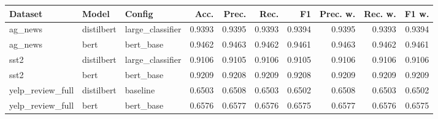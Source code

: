 \begin{tabular}{lllrrrrrrr}
\toprule
Dataset & Model & Config & Acc. & Prec. & Rec. & F1 & Prec. w. & Rec. w. & F1 w. \\
\midrule
ag\_news & distilbert & large\_classifier & 0.9393 & 0.9395 & 0.9393 & 0.9394 & 0.9395 & 0.9393 & 0.9394 \\
ag\_news & bert & bert\_base & 0.9462 & 0.9463 & 0.9462 & 0.9461 & 0.9463 & 0.9462 & 0.9461 \\
sst2 & distilbert & large\_classifier & 0.9106 & 0.9105 & 0.9106 & 0.9105 & 0.9106 & 0.9106 & 0.9106 \\
sst2 & bert & bert\_base & 0.9209 & 0.9208 & 0.9209 & 0.9208 & 0.9209 & 0.9209 & 0.9209 \\
yelp\_review\_full & distilbert & baseline & 0.6503 & 0.6508 & 0.6503 & 0.6502 & 0.6508 & 0.6503 & 0.6502 \\
yelp\_review\_full & bert & bert\_base & 0.6576 & 0.6577 & 0.6576 & 0.6575 & 0.6577 & 0.6576 & 0.6575 \\
\bottomrule
\end{tabular}
